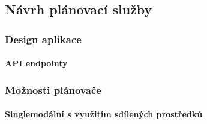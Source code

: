 \documentclass[thesis=M,czech]{FITthesis}[2019/12/23]
\theoremstyle{plain}
\theoremstyle{definition}
\begin{document}



\subsection{Návrh plánovací služby}



\subsubsection{Design aplikace}


\paragraph{API endpointy}





\subsubsection{Možnosti plánovače}

\paragraph{Singlemodální s využitím sdílených prostředků}
\end{document}
